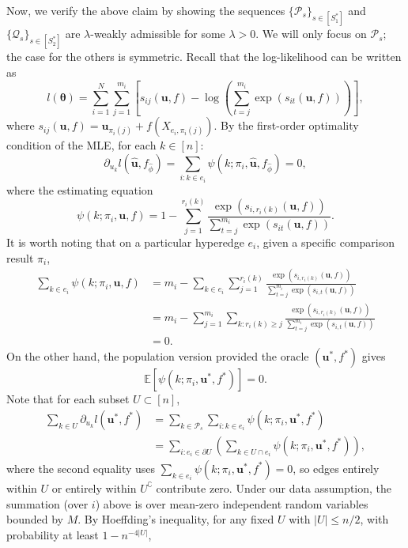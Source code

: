 \documentclass[
  12pt]{article}
\begin{document}
\noindent Now, we verify the above claim by showing the sequences $\{\mathcal{P}_s\}_{s\in[S_1^*]}$ and $\{\mathcal{Q}_s\}_{s\in[S_2^*]}$ are $\lambda$-weakly admissible for some $\lambda > 0$. We will only focus on $\mathcal{P}_s$; the case for the others is symmetric. Recall that the log-likelihood can be written as
$$l(\boldsymbol{\theta}) = \sum_{i=1}^{N} \sum_{j=1}^{m_i} \left[ s_{i j}(\boldsymbol{u},f) - \log\left( \sum_{t=j}^{m_i} \exp(s_{i t}(\boldsymbol{u},f)) \right) \right],$$
where $s_{i j}(\boldsymbol{u},f)=\boldsymbol{u}_{\pi_i(j)}+f(X_{e_i, \pi_i(j)})$. By the first-order optimality condition of the MLE, for each $k \in [n]$:
$$\partial_{u_k} l(\widehat{\boldsymbol{u}},f_{\widehat{\phi}}) = \sum_{i: k \in e_i} \psi(k; \pi_i, \widehat{\boldsymbol{u}}, f_{\widehat{\phi}}) = 0,$$
where the estimating equation
\begin{equation}
\psi(k; \pi_i, \boldsymbol{u}, f) = 1 - \sum_{j=1}^{r_i(k)} \frac{\exp(s_{i, r_i(k)}(\boldsymbol{u},f))}{\sum_{t=j}^{m_i} \exp(s_{it}(\boldsymbol{u},f))}.
\end{equation}
It is worth noting that on a particular hyperedge $e_i$, given a specific comparison result $\pi_i$, 
\begin{equation*}
\begin{aligned}
\sum_{k \in e_i} \psi(k; \pi_i, \boldsymbol{u}, f) & =m_i-\sum_{k \in e_i} \sum_{j=1}^{r_i(k)} \frac{\exp(s_{i, r_i(k)}(\boldsymbol{u},f))}{\sum_{t=j}^{m_i} \exp(s_{i,t}(\boldsymbol{u},f))} \\
& =m_i-\sum_{j=1}^{m_i} \sum_{k: r_i(k) \geq j} \frac{\exp(s_{i, r_i(k)}(\boldsymbol{u},f))}{\sum_{t=j}^{m_i}  \exp(s_{i,t}(\boldsymbol{u},f))} \\
& =0.\end{aligned}
\end{equation*}
On the other hand, the population version provided the oracle $(\boldsymbol{u}^*,f^*)$ gives
$$\mathbb{E}[\psi(k; \pi_i, \boldsymbol{u}^*,f^*)] = 0.$$
Note that for each subset $U \subset[n]$,
\begin{align}
 \sum_{k \in U} \partial_{u_k} l(\boldsymbol{u}^*,f^*)
& =\sum_{k \in \mathcal{P}_s} \sum_{i: k \in e_i} \psi(k ; \pi_i, \boldsymbol{u}^*,f^*) \\
 &= \sum_{i: e_i \in \partial U}\left(\sum_{k \in U \cap e_i} \psi(k ; \pi_i, \boldsymbol{u}^*,f^*)\right),
\end{align}
where the second equality uses $\sum_{k \in e_i}\psi(k;\pi_i,\boldsymbol{u}^*,f^*)=0$, so edges entirely within $U$ or entirely within $U^\complement$ contribute zero. Under our data assumption, the summation (over $i$) above is over mean-zero independent random variables bounded by $M$. By Hoeffding's inequality, for any fixed $U$ with $|U|\leq n/2$, with probability at least $1-n^{-4|U|}$,
\end{document}
